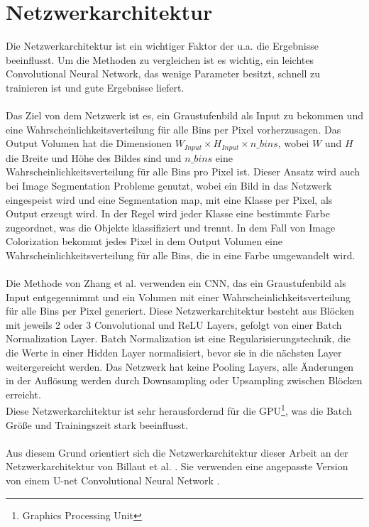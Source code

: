 \section{Netzwerkarchitektur}
Die Netzwerkarchitektur ist ein wichtiger Faktor der u.a. die Ergebnisse beeinflusst. Um die Methoden zu vergleichen ist es wichtig, ein
leichtes Convolutional Neural Network, das wenige Parameter besitzt, schnell zu trainieren ist und gute Ergebnisse liefert. 
\\
\\
Das Ziel von dem Netzwerk ist es, ein Graustufenbild als Input zu bekommen und eine Wahrscheinlichkeitsverteilung für alle Bins per Pixel vorherzusagen.
Das Output Volumen hat die Dimensionen $ W_{Input} \times H_{Input} \times n\_bins $, wobei $W$ und $H$ die Breite und Höhe des Bildes sind und
$n\_bins$ eine Wahrscheinlichkeitsverteilung für alle Bins pro Pixel ist. Dieser Ansatz wird auch bei Image Segmentation Probleme genutzt, wobei ein Bild
in das Netzwerk eingespeist wird und eine Segmentation map, mit eine Klasse per Pixel, als Output erzeugt wird. In der Regel wird jeder Klasse eine
bestimmte Farbe zugeordnet, was die Objekte klassifiziert und trennt. In dem Fall von Image Colorization bekommt jedes Pixel in dem Output Volumen
eine Wahrscheinlichkeitsverteilung für alle Bins, die in eine Farbe umgewandelt wird.
\\
\\
Die Methode von Zhang et al. \cite{zhang2016colorful} verwenden ein \gls{CNN}, das ein Graustufenbild als Input entgegennimmt und ein Volumen mit
einer Wahrscheinlichkeitsverteilung für alle Bins per Pixel generiert. Diese Netzwerkarchitektur besteht aus Blöcken mit jeweils 2 oder 3 Convolutional
und ReLU Layers, gefolgt von einer Batch Normalization Layer. Batch Normalization ist eine Regularisierungstechnik, die die Werte in einer Hidden Layer
normalisiert, bevor sie in die nächsten Layer weitergereicht werden. Das Netzwerk hat keine Pooling Layers, alle Änderungen in der Auflösung werden durch
Downsampling oder Upsampling zwischen Blöcken erreicht.
\\
Diese Netzwerkarchitektur ist sehr herausfordernd für die GPU\footnote{Graphics Processing Unit}, was die Batch Größe und Trainingszeit stark beeinflusst.
\\
\\
Aus diesem Grund orientiert sich die Netzwerkarchitektur dieser Arbeit an der Netzwerkarchitektur von Billaut et al. \cite{billaut2018colorunet}. 
Sie verwenden eine angepasste Version von einem U-net Convolutional Neural Network \cite{ronneberger2015unet}. 

